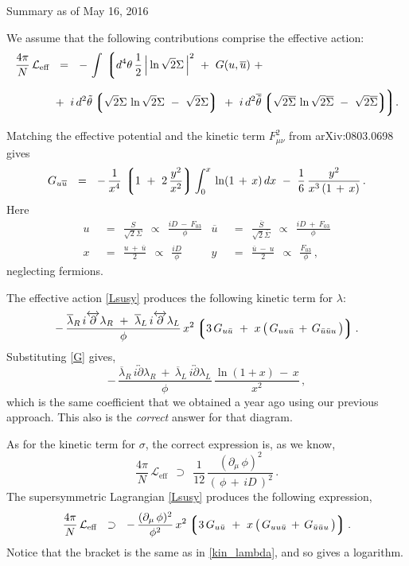 \documentclass[epsfig,12pt]{article}
\def\beq{\begin{equation}}
\def\eeq{\end{equation}}
\newcommand{\cell}{{\mathcal L}}
\newcommand{\p}{\partial}
\newcommand{\ov}{\overline}
\newcommand{\lgr}{\left\lgroup}
\newcommand{\rgr}{\right\rgroup}
\newcommand{\lar}{\lambda_R}
\newcommand{\lal}{\lambda_L}
\newcommand{\blar}{\ov{\lambda}{}_R}
\newcommand{\blal}{\ov{\lambda}{}_L}
\begin{document}
\begin{center}
\large 					Summary as of May 16, 2016\\[4mm]
\end{center}

	We assume that the following contributions comprise the effective action:
\begin{align}
\label{Lsusy}
	\frac{4\pi}{N}\, \cell_\text{eff} &    ~~=~~
	-\, \int\, \bigg\lgroup d^4\theta\, \frac{1}{2}\, \Big| \ln \sqrt{2}\Sigma \, \Big|^2
			~+~ 
	G(u, \ov u)
			~+~
	\\[2mm]
%
\notag
	&
			~+~
			i\, d^2\tilde\theta 
			\lgr \sqrt{2}\Sigma\, \ln \sqrt{2}\Sigma  ~-~ \sqrt{2}\Sigma \rgr
			~+~
			i\, d^2\ov{\tilde\theta}
			\lgr \sqrt{2}\ov\Sigma\, \ln \sqrt{2}\ov\Sigma  ~-~ \sqrt{2}\ov\Sigma \rgr
			\!\!\bigg\rgroup.
\end{align}

	Matching the effective potential and the kinetic term $ F_{\mu\nu}^2 $
	from {\sc arXiv:0803.0698} gives
\beq
%
\label{G}
	G_{u\ov u}    ~~=~~	-\,\frac{1}{x^4}\,\lgr 1 ~+~ 2\,\frac{y^2}{x^2} \rgr
				\int_0^x\, \ln (1 \,+\, x)\, dx
				~-~  \frac{1}{6}\, \frac{y^2}{x^3\, (1 \,+\, x)}\,.
\eeq
	Here
\begin{align*}
%
	u    & ~~=~~    \frac{S}{\sqrt{2}\Sigma}    ~~\propto~~    \frac{iD ~-~ F_{03}}{\phi}
%
	&
	\ov u& ~~=~~    \frac{\ov S}{\sqrt{2}\ov\Sigma}    ~~\propto~~    \frac{iD ~+~ F_{03}}{\phi}
	\\[2mm]
%
	x    & ~~=~~    \frac{u ~+~ \ov u}{2}    ~~\propto~~    \frac{iD}{\phi}
%
	&
	y    & ~~=~~    \frac{\ov u ~-~ u}{2}    ~~\propto~~    \frac{F_{03}}{\phi}
	\,,
\end{align*}
	neglecting fermions.

	The effective action \eqref{Lsusy} produces the following kinetic term for $ \lambda $:
\beq
\label{kin_lambda}
	-\, \frac{\blar\, i\overleftrightarrow{\p} \lar ~+~ \blal\, i\overleftrightarrow{\p} \lal}{\phi}\,
		x^2 \lgr 3\,G_{u\bar u}  ~+~  x\, \big(\, G_{uu\bar u} \,+\, G_{\bar u\bar u u} \,\big) \rgr.
\eeq
	Substituting \eqref{G} gives,
\beq
	-\, \frac{\blar\, i\overleftrightarrow{\p} \lar ~+~ \blal\, i\overleftrightarrow{\p} \lal}{\phi}\,
	\frac{ \ln (1 + x) \,-\, x } { x^2 }\,,
\eeq
	which is the same coefficient that we obtained a year ago using our previous approach.
	This also is the \emph{correct} answer for that diagram.

	As for the kinetic term for $ \sigma $, the correct expression is, as we know,
\beq
	\frac{4\pi}{N}\, \cell_\text{eff}    ~~\supset~~
		\frac{1}{12}\, \frac{(\p_\mu\, \phi)^2}{(\, \phi \,+\, iD \,)^2}\,.
\eeq
	The supersymmetric Lagrangian \eqref{Lsusy} produces the following
	expression,
\beq
	\frac{4\pi}{N}\, \cell_\text{eff}    ~~\supset~~
		-\, \frac{(\p_\mu\, \phi)^2}{\phi^2}\, 
		x^2 \lgr 3\,G_{u\bar u}  ~+~  x\, \big(\, G_{uu\bar u} \,+\, G_{\bar u\bar u u} \,\big) \rgr.
\eeq
	Notice that the bracket is the same as in \eqref{kin_lambda}, and so gives a logarithm.
\end{document}
